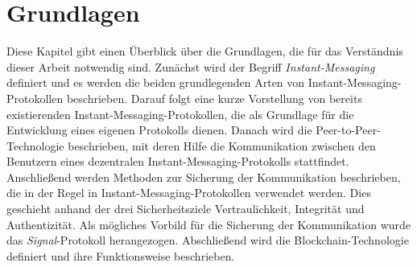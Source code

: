 \chapter{Grundlagen}
\label{chap:grundlagen}

Diese Kapitel gibt einen Überblick über die Grundlagen, die für das Verständnis dieser Arbeit notwendig sind. Zunächst wird der Begriff \textit{Instant-Messaging} definiert und es werden die beiden grundlegenden Arten von Instant-Messaging-Protokollen beschrieben. Darauf folgt eine kurze Vorstellung von bereits existierenden Instant-Messaging-Protokollen, die als Grundlage für die Entwicklung eines eigenen Protokolls dienen. Danach wird die Peer-to-Peer-Technologie beschrieben, mit deren Hilfe die Kommunikation zwischen den Benutzern eines dezentralen Instant-Messaging-Protokolls stattfindet. Anschließend werden Methoden zur Sicherung der Kommunikation  beschrieben, die in der Regel in Instant-Messaging-Protokollen verwendet werden. Dies geschieht anhand der drei Sicherheitsziele Vertraulichkeit, Integrität und Authentizität. Als mögliches Vorbild für die Sicherung der Kommunikation wurde das \textit{Signal}-Protokoll herangezogen. Abschließend wird die Blockchain-Technologie definiert und ihre Funktionsweise beschrieben.








